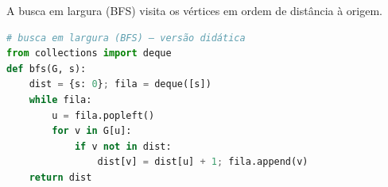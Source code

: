 A busca em largura (BFS) visita os vértices em ordem de distância à origem.
\begin{lstlisting}[language=Python]
# busca em largura (BFS) — versão didática
from collections import deque
def bfs(G, s):
    dist = {s: 0}; fila = deque([s])
    while fila:
        u = fila.popleft()
        for v in G[u]:
            if v not in dist:
                dist[v] = dist[u] + 1; fila.append(v)
    return dist
\end{lstlisting}
